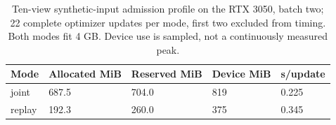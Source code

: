 \begin{table}[!t]
\centering\footnotesize
\caption{Ten-view synthetic-input admission profile on the RTX 3050, batch two; 22 complete optimizer updates per mode, first two excluded from timing. Both modes fit 4 GB. Device use is sampled, not a continuously measured peak.}
\label{tab:prelim_memory}
\begin{tabularx}{\columnwidth}{@{}p{27mm}XXXX@{}}
\toprule
Mode & Allocated MiB & Reserved MiB & Device MiB & s/update \\
\midrule
joint & 687.5 & 704.0 & 819 & 0.225 \\
replay & 192.3 & 260.0 & 375 & 0.345 \\
\bottomrule
\end{tabularx}
\end{table}